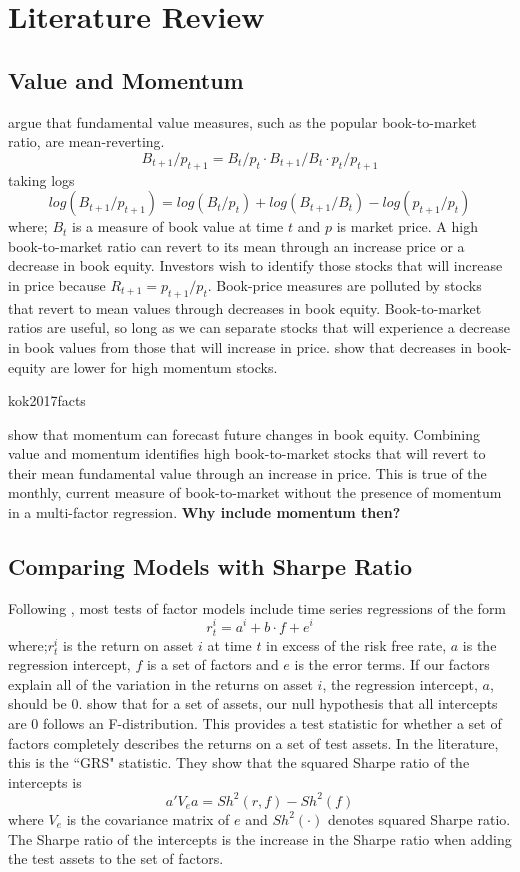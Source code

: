 
\section{Literature Review}

\subsection{Value and Momentum}

\textcite{kok2017facts} argue  that fundamental value measures, such as the popular 
book-to-market ratio, are mean-reverting.
\[
B_{t+1}/p_{t+1} = B_t/p_t \cdot B_{t+1}/B_t \cdot p_t/p_{t+1}
\]
taking logs
\[
log(B_{t+1}/p_{t+1}) = log(B_{t}/p_{t}) + log(B_{t+1}/B_{t}) - log(p_{t+1}/p_{t})
\]
where; $B_t$ is a measure of book value at time $t$ and $p$ is market price.
A high book-to-market ratio can revert to its mean through an increase price or
a decrease in book equity.
Investors wish to identify those stocks that will increase in price because
$R_{t+1}=p_{t+1}/p_{t}$.
Book-price measures are polluted by stocks that revert to mean values through
decreases in book equity.
Book-to-market ratios are useful, so long as we can separate stocks that will
experience a decrease in book values from those that will increase in price.
\textcite{kok2017facts} show that decreases in book-equity are lower for high
momentum stocks.

{kok2017facts}

\textcite{asness2013devil} show that momentum can forecast future changes in
book equity.
Combining value and momentum identifies high book-to-market stocks that will
revert to their mean fundamental value through an increase in price.
This is true of the monthly, current measure of book-to-market without the
presence of momentum in a multi-factor regression.
\textbf{Why include momentum then?}



\subsection{Comparing Models with Sharpe Ratio}

Following \textcite{jensen1968performance}, most tests of factor models include
time series regressions of the form
\[
r_t^i = a^i + b\cdot f + e^i
\]
where;$r_t^i$ is the return on asset $i$ at time $t$ in excess of the risk free
rate, $a$ is the regression intercept, $f$ is a set of factors and $e$ is the
error terms.
If our factors explain all of the variation in the returns on asset $i$, the
regression intercept, $a$, should be 0.
\textcite{gibbons1989test} show that for a set of assets, our null hypothesis
that all intercepts are 0 follows an F-distribution.
This provides a test statistic for whether a set of factors completely
describes the returns on a set of test assets.
In the literature, this is the ``GRS" statistic.
They show that the squared Sharpe ratio of the intercepts is
\[
a'V_ea = Sh^2(r,f) - Sh^2(f)
\]
where $V_e$ is the covariance matrix of $e$ and $Sh^2(\cdot)$ denotes squared
Sharpe ratio.
The Sharpe ratio of the intercepts is the increase in the Sharpe ratio when
adding the test assets to the set of factors.

